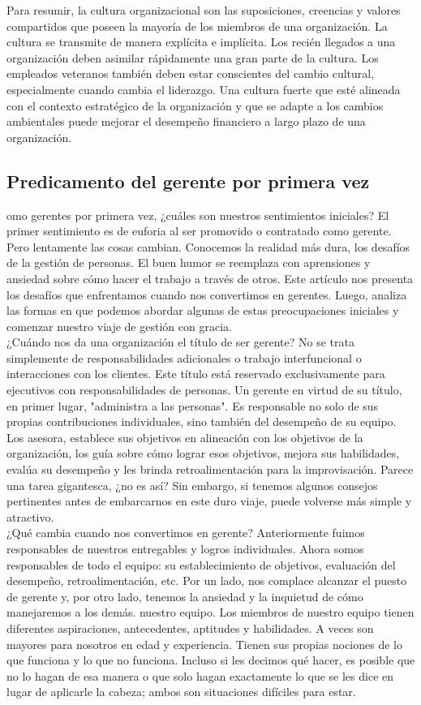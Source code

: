 \documentclass[10pt]{book}
\begin{document}
Para resumir, la cultura organizacional son las suposiciones, creencias y valores compartidos que poseen la mayoría de los miembros de una organización. La cultura se transmite de manera explícita e implícita. Los recién llegados a una organización deben asimilar rápidamente una gran parte de la cultura. Los empleados veteranos también deben estar conscientes del cambio cultural, especialmente cuando cambia el liderazgo. Una cultura fuerte que esté alineada con el contexto estratégico de la organización y que se adapte a los cambios ambientales puede mejorar el desempeño financiero a largo plazo de una organización.
\subsection{Predicamento del gerente por primera vez}
omo gerentes por primera vez, ¿cuáles son nuestros sentimientos iniciales? El primer sentimiento es de euforia al ser promovido o contratado como gerente. Pero lentamente las cosas cambian. Conocemos la realidad más dura, los desafíos de la gestión de personas. El buen humor se reemplaza con aprensiones y ansiedad sobre cómo hacer el trabajo a través de otros. Este artículo nos presenta los desafíos que enfrentamos cuando nos convertimos en gerentes. Luego, analiza las formas en que podemos abordar algunas de estas preocupaciones iniciales y comenzar nuestro viaje de gestión con gracia.\\
¿Cuándo nos da una organización el título de ser gerente? No se trata simplemente de responsabilidades adicionales o trabajo interfuncional o interacciones con los clientes. Este título está reservado exclusivamente para ejecutivos con responsabilidades de personas. Un gerente en virtud de su título, en primer lugar, "administra a las personas". Es responsable no solo de sus propias contribuciones individuales, sino también del desempeño de su equipo. Los asesora, establece sus objetivos en alineación con los objetivos de la organización, los guía sobre cómo lograr esos objetivos, mejora sus habilidades, evalúa su desempeño y les brinda retroalimentación para la improvisación. Parece una tarea gigantesca, ¿no es así? Sin embargo, si tenemos algunos consejos pertinentes antes de embarcarnos en este duro viaje, puede volverse más simple y atractivo.\\
¿Qué cambia cuando nos convertimos en gerente? Anteriormente fuimos responsables de nuestros entregables y logros individuales. Ahora somos responsables de todo el equipo: su establecimiento de objetivos, evaluación del desempeño, retroalimentación, etc. Por un lado, nos complace alcanzar el puesto de gerente y, por otro lado, tenemos la ansiedad y la inquietud de cómo manejaremos a los demás. nuestro equipo. Los miembros de nuestro equipo tienen diferentes aspiraciones, antecedentes, aptitudes y habilidades. A veces son mayores para nosotros en edad y experiencia. Tienen sus propias nociones de lo que funciona y lo que no funciona. Incluso si les decimos qué hacer, es posible que no lo hagan de esa manera o que solo hagan exactamente lo que se les dice en lugar de aplicarle la cabeza; ambos son situaciones difíciles para estar.\\
\end{document}
